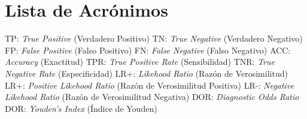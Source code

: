 \thispagestyle{empty}
\section*{Lista de Acrónimos}

TP: \textit{True Positive} (Verdadero Positivo)
\medbreak
TN: \textit{True Negative} (Verdadero Negativo)
\medbreak
FP: \textit{False Positive} (Falso Positivo)
\medbreak
FN: \textit{False Negative} (Falso Negativo)
\medbreak
ACC: \textit{Accuracy} (Exactitud)
\medbreak
TPR: \textit{True Positive Rate} (Sensibilidad)
\medbreak
TNR: \textit{True Negative Rate} (Especificidad)
\medbreak
LR+: \textit{Likehood Ratio} (Razón de Verosimilitud)
\medbreak
LR+: \textit{Positive Likehood Ratio} (Razón de Verosimilitud Positiva)
\medbreak
LR-: \textit{Negative Likehood Ratio} (Razón de Verosimilitud Negativa)
\medbreak
DOR: \textit{Diagnostic Odds Ratio}
\medbreak
DOR: \textit{Youden's Index} (Índice de Youden)

\clearpage